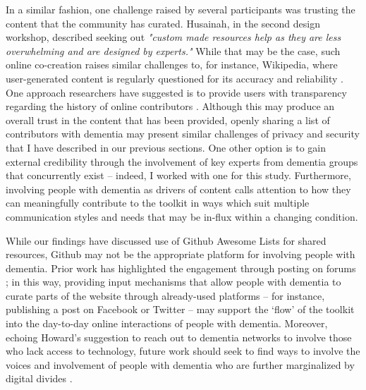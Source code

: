 In a similar fashion, one challenge raised by several participants was trusting the content that the community has curated. Husainah, in the second design workshop, described seeking out \textit{"custom made resources help as they are less overwhelming and are designed by experts."} While that may be the case, such online co-creation raises similar challenges to, for instance, Wikipedia, where user-generated content is regularly questioned for its accuracy and reliability  \citep{kittur2008can}. One approach researchers have suggested is to provide users with transparency regarding the history of online contributors \citep{heuer2018trust}. Although this may produce an overall trust in the content that has been provided, openly sharing a list of contributors with dementia may present similar challenges of privacy and security that I have described in our previous sections. One other option is to gain external credibility through the involvement of key experts from dementia groups that concurrently exist – indeed, I worked with one for this study. Furthermore, involving people with dementia as drivers of content calls attention to how they can meaningfully contribute to the toolkit in ways which suit multiple communication styles and needs that may be in-flux within a changing condition.

While our findings have discussed use of Github Awesome Lists for shared resources, Github may not be the appropriate platform for involving people with dementia. Prior work has highlighted the engagement through posting on forums \citep{johnson_older_2019,lazar_supporting_2017}; in this way, providing input mechanisms that allow people with dementia to curate parts of the website through already-used platforms – for instance, publishing a post on Facebook or Twitter \citep{talbot_how_2020} – may support the ‘flow’ of the toolkit into the day-to-day online interactions of people with dementia. Moreover, echoing Howard’s suggestion to reach out to dementia networks to involve those who lack access to technology, future work should seek to find ways to involve the voices and involvement of people with dementia who are further marginalized by digital divides \citep{harrington_forgotten_2020}.

